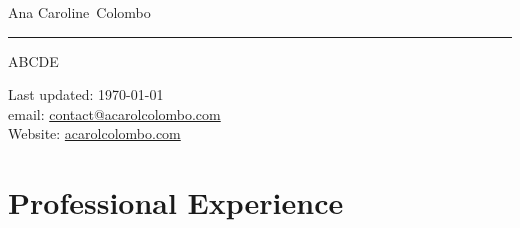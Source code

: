 \documentclass[11pt, a4paper]{article}
\makeatletter
\newcommand{\FirstName}{Ana Caroline}
\newcommand{\LastName}{Colombo}
\newcommand{\MyName}{\FirstName\ \LastName}
\newcommand{\Email}{contact@acarolcolombo.com}
\newcommand{\Website}{acarolcolombo.com}
\makeatother
\begin{document}
\thispagestyle{empty}


{\fontsize{20pt}{0}\selectfont \MyName}	\\[0.3cm]
\rule{\textwidth}{0.2pt}
\begin{minipage}[t]{0.595\textwidth}
	ABCDE
\end{minipage}
\begin{minipage}[t]{0.405\textwidth}
  \begin{flushright}
  Last updated: \monthyear\today
  \\
    email: \href{mailto:\Email}{\Email}
    \\
    Website: \href{https://www.\Website}{\Website}
  \end{flushright}
\end{minipage}

\section*{Professional Experience}
\end{document}
